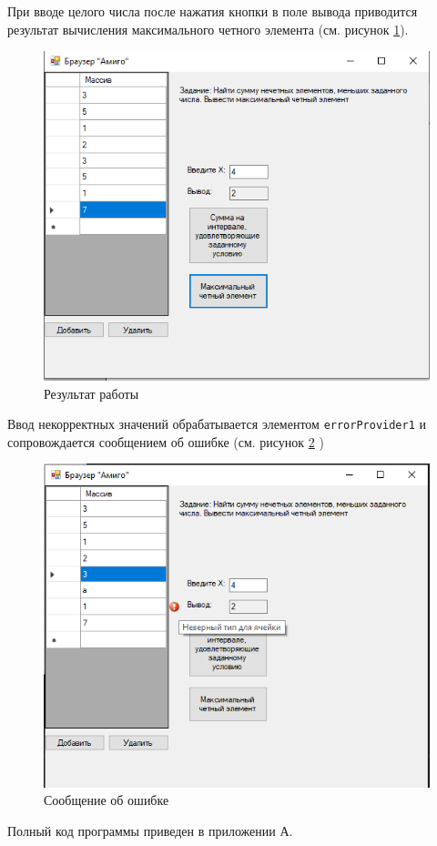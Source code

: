 При вводе целого числа после нажатия кнопки в поле вывода приводится
результат вычисления максимального четного элемента (см. рисунок \ref{fig:result42}).
\begin{figure}[H]
    \centering
    \includegraphics{task4/result2.png}
    \caption{Результат работы}
    \label{fig:result42}
\end{figure}

Ввод некорректных значений обрабатывается элементом \verb|errorProvider1| и 
сопровождается сообщением об ошибке (см. рисунок \ref{fig:error4} )
\begin{figure}[H]
    \centering
    \includegraphics{task4/error.png}
    \caption{Сообщение об ошибке}
    \label{fig:error4}
\end{figure}
Полный код программы приведен в приложении А.